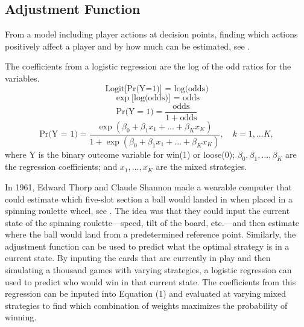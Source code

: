 
\subsection{Adjustment Function}

From a model including player actions at decision points, finding which actions positively affect a player and by how much can be estimated, see \cite{Shanahan:1984}.

The coefficients from a logistic regression are the log of the odd ratios for the variables.
$$ \text{Logit[Pr(Y=1)] = log(odds)} $$
$$ \exp[\text{log(odds)] = odds} $$
$$ \text{Pr(Y} = 1) = \frac{\text{odds}}{1+\text{odds}} $$
\begin{equation}
 \text{Pr(Y = 1)} = \frac{\exp(\beta_0 + \beta_1 x_1 + ... + \beta_K x_K)}{1 + \exp(\beta_0 + \beta_1 x_1 + ... + \beta_K x_K)}, \quad k=1,...K , 
 \end{equation}
where Y is the binary outcome variable for win(1) or loose(0); $\beta_0, \beta_1, ..., \beta_K$ are the regression coefficients; and $x_1,..., x_K$ are the mixed strategies.


In 1961, Edward Thorp and Claude Shannon made a wearable computer that could estimate which five-slot section a ball would landed in when placed in a spinning roulette wheel, see \cite{Thorp:2017}. The idea was that they could input the current state of the spinning roulette---speed, tilt of the board, etc.---and then estimate where the ball would land from a predetermined reference point. Similarly, the adjustment function can be used to predict what the optimal strategy is in a current state. By inputing the cards that are currently in play and then simulating a thousand games with varying strategies, a logistic regression can used to predict who would win in that current state. The coefficients from this regression can be inputed into Equation (1) and evaluated at varying mixed strategies to find which combination of weights maximizes the probability of winning.



